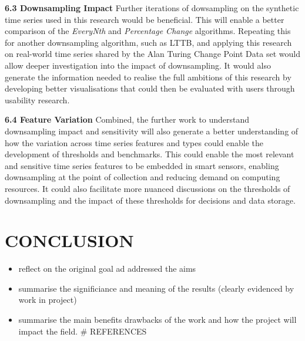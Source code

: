 \documentclass{article}
\providecommand{\tightlist}{%
  \setlength{\itemsep}{0pt}\setlength{\parskip}{0pt}}
\begin{document}
\textbf{6.3 Downsampling Impact} Further iterations of dowsampling on
the synthetic time series used in this research would be beneficial.
This will enable a better comparison of the \emph{EveryNth} and
\emph{Percentage Change} algorithms. Repeating this for another
downsampling algorithm, such as LTTB, and applying this research on
real-world time series shared by the Alan Turing Change Point Data set
would allow deeper investigation into the impact of downsampling. It
would also generate the information needed to realise the full ambitions
of this research by developing better visualisations that could then be
evaluated with users through usability research.

\textbf{6.4 Feature Variation} Combined, the further work to understand
downsampling impact and sensitivity will also generate a better
understanding of how the variation across time series features and types
could enable the development of thresholds and benchmarks. This could
enable the most relevant and sensitive time series features to be
embedded in smart sensors, enabling downsampling at the point of
collection and reducing demand on computing resources. It could also
facilitate more nuanced discussions on the thresholds of downsampling
and the impact of these thresholds for decisions and data storage.

\hypertarget{conclusion}{%
\section{CONCLUSION}\label{conclusion}}

\label{sec:headings}

\begin{itemize}
\tightlist
\item
  reflect on the original goal ad addressed the aims
\item
  summarise the significiance and meaning of the results (clearly
  evidenced by work in project)
\item
  summarise the main benefits drawbacks of the work and how the project
  will impact the field. \# REFERENCES \label{sec:headings}
\end{itemize}
\end{document}
